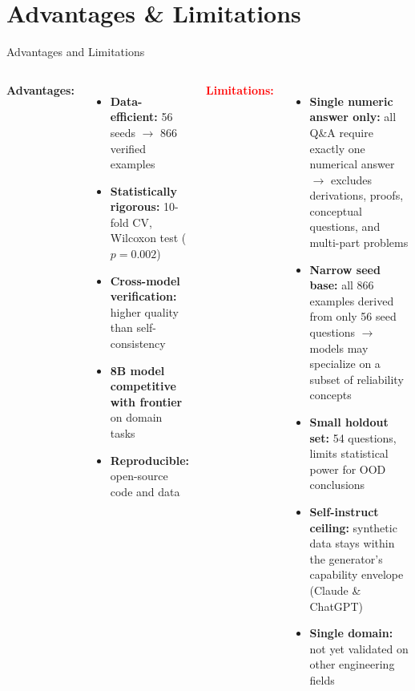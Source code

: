 \documentclass[aspectratio=169,10pt]{beamer}
\begin{document}
\section{Advantages \& Limitations}
\begin{frame}{Advantages and Limitations}
\begin{columns}[T]
\textbf{\textcolor{green!50!black}{Advantages:}}
\begin{itemize}\small
  \item \textbf{Data-efficient:} 56 seeds $\to$ 866 verified examples
  \item \textbf{Statistically rigorous:} 10-fold CV, Wilcoxon test ($p=0.002$)
  \item \textbf{Cross-model verification:} higher quality than self-consistency
  \item \textbf{8B model competitive with frontier} on domain tasks
  \item \textbf{Reproducible:} open-source code and data
\end{itemize}

\textbf{\textcolor{red}{Limitations:}}
\begin{itemize}\small
  \item \textbf{Single numeric answer only:} all Q\&A require exactly one numerical answer $\to$ excludes derivations, proofs, conceptual questions, and multi-part problems
  \item \textbf{Narrow seed base:} all 866 examples derived from only 56 seed questions $\to$ models may specialize on a subset of reliability concepts
    \item \textbf{Small holdout set:} 54 questions, limits statistical power for OOD conclusions
  \item \textbf{Self-instruct ceiling:} synthetic data stays within the generator's capability envelope (Claude & ChatGPT)
  \item \textbf{Single domain:} not yet validated on other engineering fields
\end{itemize}
\end{columns}
\end{frame}

\end{document}
